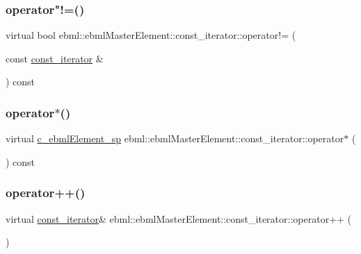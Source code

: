 \subsubsection{\texorpdfstring{operator"!=()}{operator!=()}}
{\footnotesize\ttfamily virtual bool ebml\+::ebml\+Master\+Element\+::const\+\_\+iterator\+::operator!= (\begin{DoxyParamCaption}\item[{const \mbox{\hyperlink{classebml_1_1ebmlMasterElement_1_1const__iterator}{const\+\_\+iterator}} \&}]{ }\end{DoxyParamCaption}) const\hspace{0.3cm}{\ttfamily [virtual]}}

\mbox{\label{classebml_1_1ebmlMasterElement_1_1const__iterator_ae661352a7787687258bc749a70a2811b}} 
\subsubsection{\texorpdfstring{operator$\ast$()}{operator*()}}
{\footnotesize\ttfamily virtual \mbox{\hyperlink{namespaceebml_a2deef4e8071531b32e3533f1bf978917}{c\+\_\+ebml\+Element\+\_\+sp}} ebml\+::ebml\+Master\+Element\+::const\+\_\+iterator\+::operator$\ast$ (\begin{DoxyParamCaption}{ }\end{DoxyParamCaption}) const\hspace{0.3cm}{\ttfamily [virtual]}}

\mbox{\label{classebml_1_1ebmlMasterElement_1_1const__iterator_ae9f1b67c2ac0023a09f2816aaf7e9c71}} 
\subsubsection{\texorpdfstring{operator++()}{operator++()}}
{\footnotesize\ttfamily virtual \mbox{\hyperlink{classebml_1_1ebmlMasterElement_1_1const__iterator}{const\+\_\+iterator}}\& ebml\+::ebml\+Master\+Element\+::const\+\_\+iterator\+::operator++ (\begin{DoxyParamCaption}{ }\end{DoxyParamCaption})\hspace{0.3cm}{\ttfamily [virtual]}}

